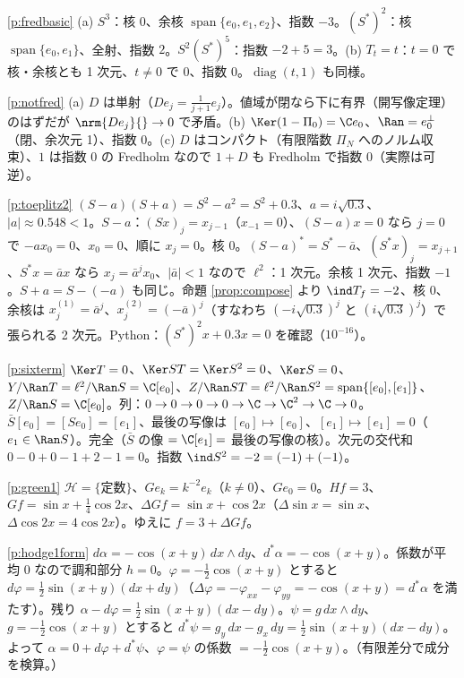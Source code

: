 \begin{sol}{\ref{p:fredbasic}}
(a) $S^3$：核 $0$、余核 $\operatorname{span}\{e_0,e_1,e_2\}$、指数 $-3$。$(S^*)^2$：核 $\operatorname{span}\{e_0,e_1\}$、全射、指数 $2$。$S^2(S^*)^5$：指数 $-2+5=3$。(b) $T_t=t$：$t=0$ で核・余核とも 1 次元、$t\ne0$ で $0$、指数 $0$。$\operatorname{diag}(t,1)$ も同様。
\end{sol}
\begin{sol}{\ref{p:notfred}}
(a) $D$ は単射（$De_j=\frac1{j+1}e_j$）。値域が閉なら下に有界（開写像定理）のはずだが $\nrm{De_j}{}\to0$ で矛盾。(b) $\Ker(1-\Pi_0)=\C e_0$、$\Ran=e_0^\perp$（閉、余次元 1）、指数 $0$。(c) $D$ はコンパクト（有限階数 $\Pi_N$ へのノルム収束）、$1$ は指数 $0$ の Fredholm なので $1+D$ も Fredholm で指数 $0$（実際は可逆）。
\end{sol}
\begin{sol}{\ref{p:toeplitz2}}
$(S-a)(S+a)=S^2-a^2=S^2+0.3$、$a=i\sqrt{0.3}$、$|a|\approx0.548<1$。$S-a$：$(Sx)_j=x_{j-1}$（$x_{-1}=0$）、$(S-a)x=0$ なら $j=0$ で $-ax_0=0$、$x_0=0$、順に $x_j=0$。核 $0$。$(S-a)^*=S^*-\bar a$、$(S^*x)_j=x_{j+1}$、$S^*x=\bar ax$ なら $x_j=\bar a^jx_0$、$|\bar a|<1$ なので $\ell^2$：1 次元。余核 1 次元、指数 $-1$。$S+a=S-(-a)$ も同じ。命題 \ref{prop:compose} より $\ind T_f=-2$、核 $0$、余核は $x^{(1)}_j=\bar a^j$、$x^{(2)}_j=(-\bar a)^j$（すなわち $(-i\sqrt{0.3})^j$ と $(i\sqrt{0.3})^j$）で張られる 2 次元。Python：$(S^*)^2x+0.3x=0$ を確認（$10^{-16}$）。
\end{sol}
\begin{sol}{\ref{p:sixterm}}
$\Ker T=0$、$\Ker ST=\Ker S^2=0$、$\Ker S=0$、$Y/\Ran T=\ell^2/\Ran S=\C[e_0]$、$Z/\Ran ST=\ell^2/\Ran S^2=\operatorname{span}\{[e_0],[e_1]\}$、$Z/\Ran S=\C[e_0]$。列：$0\to0\to0\to0\to\C\to\C^2\to\C\to0$。$\bar S[e_0]=[Se_0]=[e_1]$、最後の写像は $[e_0]\mapsto[e_0]$、$[e_1]\mapsto[e_1]=0$（$e_1\in\Ran S$）。完全（$\bar S$ の像 $=\C[e_1]=$ 最後の写像の核）。次元の交代和 $0-0+0-1+2-1=0$。指数 $\ind S^2=-2=(-1)+(-1)$。
\end{sol}
\begin{sol}{\ref{p:green1}}
$\mathcal H=\{\text{定数}\}$、$Ge_k=k^{-2}e_k$（$k\ne0$）、$Ge_0=0$。$Hf=3$、$Gf=\sin x+\frac14\cos2x$、$\Delta Gf=\sin x+\cos2x$（$\Delta\sin x=\sin x$、$\Delta\cos2x=4\cos2x$）。ゆえに $f=3+\Delta Gf$。
\end{sol}
\begin{sol}{\ref{p:hodge1form}}
$d\alpha=-\cos(x+y)\,dx\wedge dy$、$d^*\alpha=-\cos(x+y)$。係数が平均 $0$ なので調和部分 $h=0$。$\varphi=-\frac12\cos(x+y)$ とすると $d\varphi=\frac12\sin(x+y)(dx+dy)$（$\Delta\varphi=-\varphi_{xx}-\varphi_{yy}=-\cos(x+y)=d^*\alpha$ を満たす）。残り $\alpha-d\varphi=\frac12\sin(x+y)(dx-dy)$。$\psi=g\,dx\wedge dy$、$g=-\frac12\cos(x+y)$ とすると $d^*\psi=g_y\,dx-g_x\,dy=\frac12\sin(x+y)(dx-dy)$。よって $\alpha=0+d\varphi+d^*\psi$、$\varphi=\psi$ の係数 $=-\frac12\cos(x+y)$。（有限差分で成分を検算。）
\end{sol}
